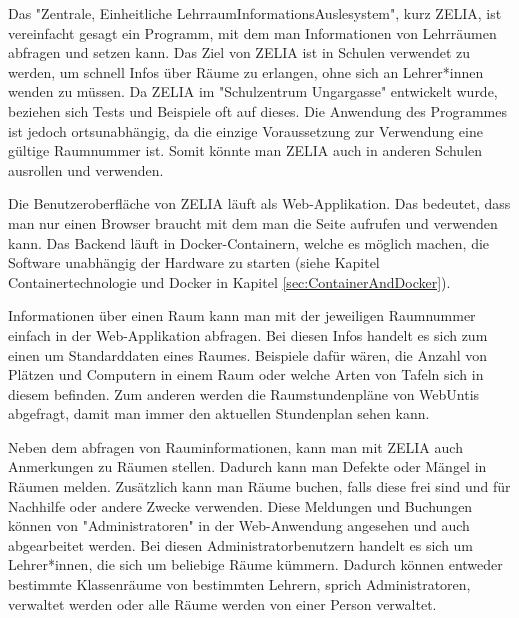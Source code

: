 

Das "Zentrale, Einheitliche LehrraumInformationsAuslesystem", kurz ZELIA, ist vereinfacht gesagt ein Programm, mit dem man Informationen von Lehrräumen abfragen und setzen kann. Das Ziel von ZELIA ist in Schulen verwendet zu werden, um schnell Infos über Räume zu erlangen, ohne sich an Lehrer*innen wenden zu müssen. Da \mbox{ZELIA} im "Schulzentrum Ungargasse" entwickelt wurde, beziehen sich Tests und Beispiele oft auf dieses. Die Anwendung des Programmes ist jedoch ortsunabhängig, da die einzige Voraussetzung zur Verwendung eine gültige Raumnummer ist. Somit könnte man ZELIA auch in anderen Schulen ausrollen und verwenden. 

Die Benutzeroberfläche von ZELIA läuft als Web-Applikation. Das bedeutet, dass man nur einen Browser braucht mit dem man die Seite aufrufen und verwenden kann. Das Backend läuft in Docker-Containern, welche es möglich machen, die Software unabhängig der Hardware zu starten (siehe Kapitel Containertechnologie und Docker in Kapitel \ref{sec:ContainerAndDocker}).

Informationen über einen Raum kann man mit der jeweiligen Raumnummer einfach in der Web-Applikation abfragen. Bei diesen Infos handelt es sich zum einen um Standarddaten eines Raumes. Beispiele dafür wären, die Anzahl von Plätzen und Computern in einem Raum oder welche Arten von Tafeln sich in diesem befinden. Zum anderen werden die Raumstundenpläne von WebUntis abgefragt, damit man immer den aktuellen Stundenplan sehen kann.

Neben dem abfragen von Rauminformationen, kann man mit ZELIA auch Anmerkungen zu Räumen stellen. Dadurch kann man Defekte oder Mängel in Räumen melden. Zusätzlich kann man Räume buchen, falls diese frei sind und für Nachhilfe oder andere Zwecke verwenden. Diese Meldungen und Buchungen können von "Administratoren" in der Web-Anwendung angesehen und auch abgearbeitet werden. Bei diesen Administratorbenutzern handelt es sich um Lehrer*innen, die sich um beliebige Räume kümmern. Dadurch können entweder bestimmte Klassenräume von bestimmten Lehrern, sprich Administratoren, verwaltet werden oder alle Räume werden von einer Person verwaltet.

